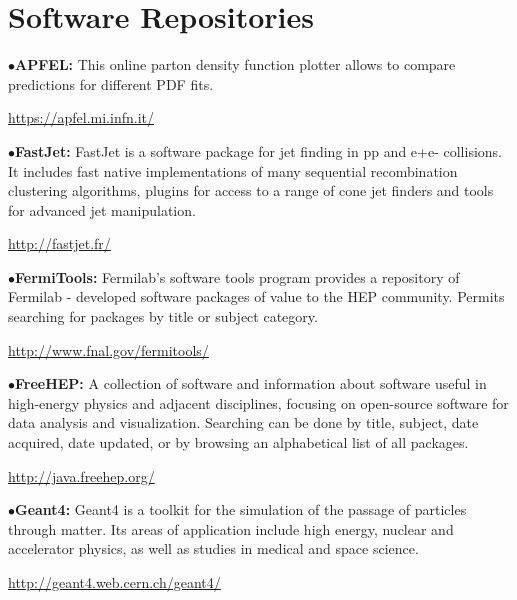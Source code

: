\section{Software Repositories}  %

\medskip

\medskip

\item{$\bullet$}{\bf APFEL:} 
This online parton density function plotter allows to compare predictions for different PDF fits.
	\item{}\qquad\url{https://apfel.mi.infn.it/}

\medskip

\item{$\bullet$}{\bf FastJet:} 
FastJet is a software package for jet finding in pp and e+e- collisions. It includes fast native implementations of many sequential recombination clustering algorithms, plugins for access to a range of cone jet finders and tools for advanced jet manipulation.
	\item{}\qquad\url{http://fastjet.fr/}

\medskip

\item{$\bullet$}{\bf FermiTools:}
Fermilab's software tools program provides a repository of Fermilab - developed software packages of value to the HEP community. Permits searching for packages by title or subject category.
	\item{}\qquad\url{http://www.fnal.gov/fermitools/}

\medskip

\item{$\bullet$}{\bf FreeHEP:}
A collection of software and information about software useful in high-energy physics and adjacent disciplines, focusing on open-source software for data analysis and visualization. Searching can be done by title, subject, date acquired, date updated, or by browsing an alphabetical list of all packages.
	\item{}\qquad\url{http://java.freehep.org/}

\medskip

\item{$\bullet$}{\bf Geant4:}
Geant4 is a toolkit for the simulation of the passage of particles through matter. Its areas of application include high energy, nuclear and accelerator physics, as well as studies in medical and space science.
	\item{}\qquad\url{http://geant4.web.cern.ch/geant4/}

